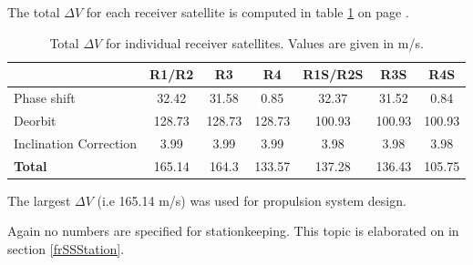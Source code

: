 The total $\Delta V$ for each receiver satellite is computed in table \ref{table:dVrec} on page \pageref{table:dVrec}.

\begin{table}[!h]
\begin{centering}
\begin{tabular}{lcccccc}
\toprule
				&			R1/R2			&			R3			&			R4		& R1S/R2S & R3S & R4S \\
\hline \hline
Phase shift				&			32.42						&			31.58		&			0.85		& 32.37 & 31.52 & 0.84	 \\
Deorbit				&			128.73						&			128.73		&			128.73		& 100.93 & 100.93 & 100.93	 \\
Inclination Correction			&			3.99						&			3.99		&			3.99		& 3.98 & 3.98 & 3.98	 \\ \hline \hline
\textbf{Total	}		&			165.14						&			164.3		&			133.57		& 137.28 & 136.43 & 105.75	 \\
\bottomrule
\end{tabular}
\caption{Total $\Delta V$ for individual receiver satellites. Values are given in m/s.}
\label{table:dVrec}
\end{centering}
\end{table}

The largest $\Delta V$ (i.e 165.14 m/s) was used for propulsion system design.

Again no numbers are specified for stationkeeping. This topic is elaborated on in section \ref{frSSStation}.

